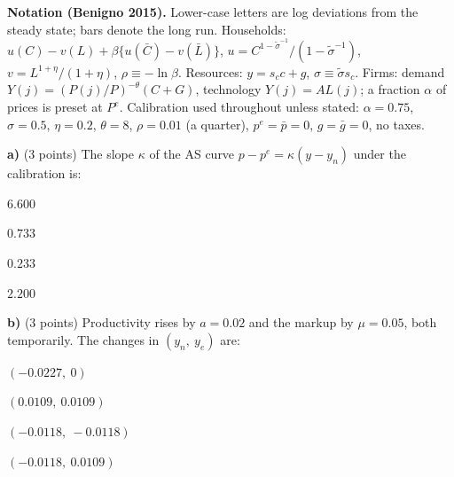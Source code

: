 \documentclass[11pt,a4paper]{article}
\begin{document}
\cabecalho

{\footnotesize\noindent\textbf{Notation (Benigno 2015).} Lower-case letters are log deviations from the
steady state; bars denote the long run. Households: $u(C)-v(L)+\beta\{u(\bar C)-v(\bar L)\}$,
$u=C^{1-\tilde\sigma^{-1}}/(1-\tilde\sigma^{-1})$, $v=L^{1+\eta}/(1+\eta)$, $\rho\equiv-\ln\beta$. Resources: $y=s_cc+g$,
$\sigma\equiv\tilde\sigma s_c$. Firms: demand $Y(j)=(P(j)/P)^{-\theta}(C+G)$, technology $Y(j)=AL(j)$; a fraction $\alpha$ of
prices is preset at $P^e$. Calibration used throughout unless stated: $\alpha=0.75$, $\sigma=0.5$, $\eta=0.2$, $\theta=8$,
$\rho=0.01$ (a quarter), $p^e=\bar p=0$, $g=\bar g=0$, no taxes.\par}



\textbf{a)} (3 points) The slope $\kappa$ of the AS curve $p-p^e=\kappa(y-y_n)$ under the calibration is:
\begin{alternativas}
\item $6.600$
\item $0.733$
\item $0.233$
\item $2.200$
\end{alternativas}
\begin{sol}
\end{sol}

\medskip
\textbf{b)} (3 points) Productivity rises by $a=0.02$ and the markup by $\mu=0.05$, both temporarily. The changes in
$(y_n,\ y_e)$ are:
\begin{alternativas}
\item $(-0.0227,\ 0)$
\item $(0.0109,\ 0.0109)$
\item $(-0.0118,\ -0.0118)$
\item $(-0.0118,\ 0.0109)$
\end{alternativas}
\begin{sol}
\end{sol}
\end{document}
